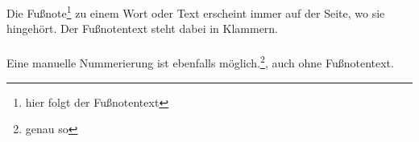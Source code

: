 \documentclass[a4paper, pdftex, 12pt, ngerman]{article}
\begin{document}
Die Fußnote\footnote{hier folgt der Fußnotentext} zu einem Wort oder Text erscheint immer auf der Seite, wo sie hingehört. Der Fußnotentext steht dabei in Klammern.\\
\\
Eine manuelle Nummerierung ist ebenfalls möglich.\footnote[10]{genau so}, auch ohne Fußnotentext\footnotemark[2].
\end{document}
